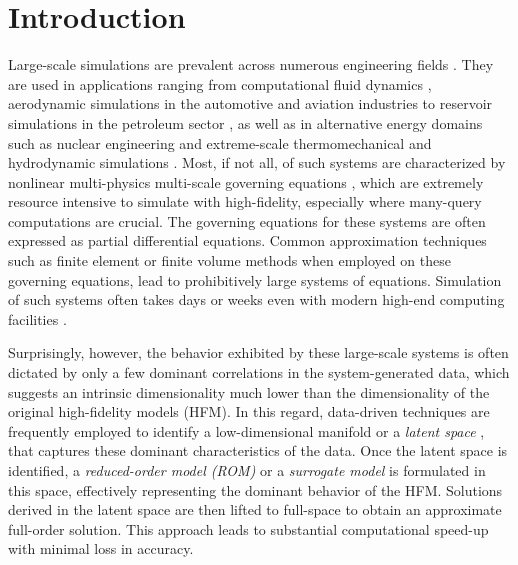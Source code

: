 \documentclass[11pt]{article}
\begin{document}
    \section{Introduction}

    Large-scale simulations \cite{AthanasiosAntoulasUnknown} are prevalent across numerous engineering fields \cite{benner2020model}.
    They are used in applications ranging from computational fluid dynamics \cite{moin1998direct,germano1991a_dynamic,slotnick2014cfd,dowell2001modeling}, aerodynamic simulations in the automotive and aviation industries \cite{mehta2014large,ripepi2018reduced-order,Mavriplis_2007} to reservoir simulations in the petroleum sector \cite{Jenny2003multi,germano1991a_dynamic}, as well as in alternative energy domains such as nuclear engineering \cite{williamson2012multidimensional,gaston2015physics} and extreme-scale thermomechanical and hydrodynamic simulations \cite{jamshidiaval2021comprehensive,dambakizi2009multiscale,zhang2016thermo-mechanical,tasker2008a_hydrodynamic}.
    Most, if not all, of such systems are characterized by nonlinear multi-physics multi-scale governing equations \cite{Guillot_2019,Huang_2017,kramer2016model}, which are extremely resource intensive to simulate with high-fidelity, especially where many-query computations are crucial.
    The governing equations for these systems are often expressed as partial differential equations.
    Common approximation techniques such as finite element \cite{zienkiewicz2005finite,nreddy2018introduction,jrhughes2000finite,hughes2012finite} or finite volume methods \cite{moukalled2016finite,versteeg_introduction_2007} when employed on these governing equations, lead to prohibitively large systems of equations.
    Simulation of such systems often takes days or weeks even with modern high-end computing facilities \cite{farhat2014dimensional}.


    Surprisingly, however, the behavior exhibited by these large-scale systems is often dictated by only a few dominant correlations in the system-generated data, which suggests an intrinsic dimensionality \cite{camastra2016intrinsic,kak2020intrinsic,verleysen1999forecasting,verveer1995evaluation} much lower than the dimensionality of the original high-fidelity models (HFM).
    In this regard, data-driven techniques are frequently employed to identify a low-dimensional manifold or a \textit{latent space} \cite{Fries_2022,ghojogh2023elements}, that captures these dominant characteristics of the data.
    Once the latent space is identified, a \textit{reduced-order model (ROM)} or a \textit{surrogate model} \cite{lucia2004reduced-order,moore2003principal,holmes1996turbulence,rowley2005model,kerschen2005the,hall2010proper,dowell2023reduced}%
    is formulated in this space, effectively representing the dominant behavior of the HFM.
    Solutions derived in the latent space are then lifted to full-space to obtain an approximate full-order solution.
    This approach leads to substantial computational speed-up with minimal loss in accuracy.
\end{document}
